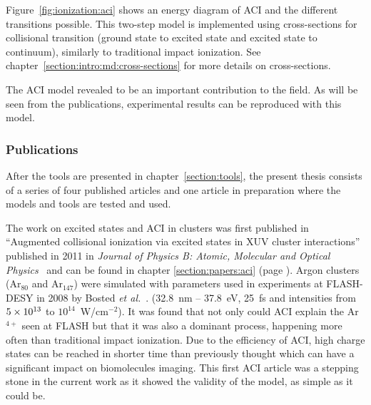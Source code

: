 Figure~\ref{fig:ionization:aci} shows an energy diagram of ACI and the
different transitions possible. This two-step model is implemented using
cross-sections for collisional transition (ground state to excited state and
excited state to continuum), similarly to traditional impact
ionization. See chapter~\ref{section:intro:md:cross-sections} for more
details on cross-sections.

The ACI model revealed to be an important contribution to the field. As will be
seen from the publications, experimental results can be reproduced with this
model.



\subsubsection{Publications}

After the tools are presented in chapter~\ref{section:tools}, the present thesis
consists of a series of four published articles and one article in preparation
where the models and tools are tested and used.



The work on excited states and ACI in clusters was first published in
``Augmented collisional ionization via excited states in XUV cluster
interactions'' published in 2011 in \textit{Journal of Physics B: Atomic,
Molecular and Optical Physics}~\cite{Ackad2011a} and can be found in chapter
\ref{section:papers:aci} (page \pageref{section:papers:aci}). Argon clusters
(Ar$_{80}$ and Ar$_{147}$) were simulated with parameters used in experiments
at FLASH-DESY in 2008 by Bosted \textit{et al.}~\cite{Bostedt2008}.
(32.8~nm -- 37.8~eV, 25~fs and intensities from $\ten{5}{13}$ to
$10^{14}$~W/cm$^{-2}$). It was found that not only could ACI explain the
Ar$^{4+}$ seen at FLASH but that it
was also a dominant process, happening more often than traditional impact ionization.
Due to the efficiency of ACI, high charge states can be reached in shorter time
than previously thought which can have a significant impact on biomolecules
imaging. This first ACI article was a stepping stone in the current work as it
showed the validity of the model, as simple as it could be.



